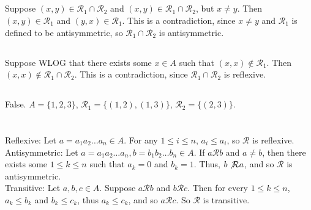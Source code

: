 \documentclass{article}
\begin{document}
\subsection{} %
Suppose $(x,y)\in\mathcal R_1 \cap \mathcal R_2$ and $(x,y)\in\mathcal R_1 \cap \mathcal R_2$,
but $x\neq y$. Then $(x,y)\in\mathcal R_1$ and $(y,x)\in\mathcal R_1$. This is a contradiction,
since $x\neq y$ and $\mathcal R_1$ is defined to be antisymmetric, so
$\mathcal R_1 \cap \mathcal R_2$ is antisymmetric.
\subsection{} %
Suppose WLOG that there exists some $x\in A$ such that $(x,x)\not\in\mathcal R_1$.
Then $(x,x)\not\in\mathcal R_1 \cap \mathcal R_2$. This is a contradiction, since
$\mathcal R_1 \cap \mathcal R_2$ is reflexive.
\subsection{} %
False. $A=\{1,2,3\}$, $\mathcal R_1=\{(1,2),(1,3)\}$, $\mathcal R_2=\{(2,3)\}$.

\section{} %
\subsection{} %
Reflexive: Let $a=a_1a_2\ldots a_n \in A$. For any $1\le i \le n$, $a_i\le a_i$,
so $\mathcal R$ is reflexive.\\
Antisymmetric: Let $a=a_1a_2\ldots a_n,b=b_1b_2\ldots b_n \in A$. If $a\mathcal R b$
and $a\neq b$, then there exists some $1\le k \le n$ such that $a_k=0$ and $b_k=1$.
Thus, $b\not\mathcal R a$, and so $\mathcal R$ is antisymmetric.\\
Transitive: Let $a,b,c\in A$. Suppose $a\mathcal R b$ and $b\mathcal R c$. Then
for every $1\le k \le n$, $a_k \le b_k$ and $b_k \le c_k$, thus $a_k \le c_k$,
and so $a\mathcal R c$. So $\mathcal R$ is transitive.
\subsection{} %
$\;$\\\\\\\\\\\\\\\\\\\\\\\\\\\\\\\\\\
\end{document}
